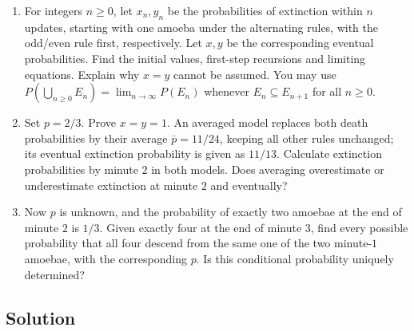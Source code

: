 \documentclass[11pt,a4paper]{article}
\newcommand{\Prob}{P}
\begin{document}
\begin{enumerate}
\item For integers $n\geq0$, let $x_n,y_n$ be the probabilities of
extinction within $n$ updates, starting with one amoeba under the
alternating rules, with the odd/even rule first, respectively. Let $x,y$ be the corresponding
eventual probabilities. Find the initial values, first-step recursions
and limiting equations. Explain why $x=y$ cannot be assumed.
You may use \mbox{$\Prob(\bigcup_{n\geq0}E_n)=\lim_{n\to\infty}\Prob(E_n)$}
whenever $E_n\subseteq E_{n+1}$ for all $n\geq0$.

\item Set $p=2/3$. Prove $x=y=1$. An averaged model replaces both
death probabilities by their average $\bar p=11/24$, keeping all other rules unchanged;
its eventual extinction probability is given as $11/13$.
Calculate extinction probabilities by minute $2$ in both models.
Does averaging overestimate or underestimate extinction at minute $2$
and eventually?

\item Now $p$ is unknown, and the probability of exactly two amoebae
at the end of minute $2$ is $1/3$. Given exactly four at the end of
minute $3$, find every possible probability that all four descend
from the same one of the two minute-$1$ amoebae, with the corresponding
$p$. Is this conditional probability uniquely determined?
\end{enumerate}

\subsection*{Solution}
\end{document}
